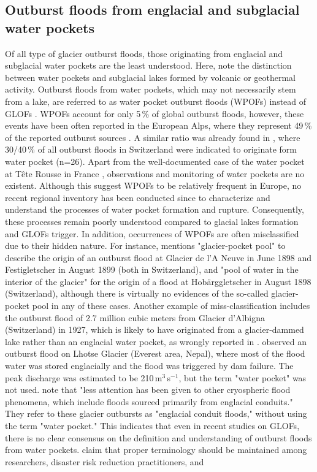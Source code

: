 \subsection{Outburst floods from englacial and subglacial water pockets} %

Of all type of glacier outburst floods, those originating from englacial and subglacial water pockets are the least understood. Here, note the distinction between water pockets and subglacial lakes formed by volcanic or geothermal activity. Outburst floods from water pockets, which may not necessarily stem from a lake, are referred to as water pocket outburst floods (WPOFs) instead of GLOFs \citep[as in][]{Deline&al2004}. WPOFs account for only 5\,\% of global outburst floods, however, these events have been often reported in the European Alps, where they represent 49\,\% of the reported outburst sources \citep{Lutzow&al2023}. A similar ratio was already found in \cite{Haeberli1983}, where 30/40\,\% of all outburst floods in Switzerland were indicated to originate form water pocket (n=26). Apart from the well-documented case of the water pocket at Tête Rousse in France \citep{Vincent&al2010b,Vincent&al2012}, observations and monitoring of water pockets are no existent. Although this suggest WPOFs to be relatively frequent in Europe, no recent regional inventory has been conducted since \cite{Haeberli1983} to characterize and understand the processes of water pocket formation and rupture. Consequently, these processes remain poorly understood compared to glacial lakes formation and GLOFs trigger. In addition, occurrences of WPOFs are often misclassified due to their hidden nature. For instance, \cite{Rabot1905} mentions "glacier-pocket pool" to describe the origin of an outburst flood at Glacier de l'A Neuve in June 1898 and Festigletscher in August 1899 (both in Switzerland), and "pool of water in the interior of the glacier" for the origin of a flood at Hobärggletscher in August 1898 (Switzerland), although there is virtually no evidences of the so-called glacier-pocket pool in any of these cases. Another example of miss-classification includes the outburst flood of 2.7 million cubic meters from Glacier d'Albigna (Switzerland) in 1927, which is likely to have originated from a glacier-dammed lake rather than an englacial water pocket, as wrongly reported in \cite{Lutzow&al2023}. \cite{Rounce&al2017} observed an outburst flood on Lhotse Glacier (Everest area, Nepal), where most of the flood water was stored englacially and the flood was triggered by dam failure. The peak discharge was estimated to be 210\,m$^3$\,s$^{-1}$, but the term "water pocket" was not used. \cite{Byers&al2022} note that "less attention has been given to other cryospheric flood phenomena, which include floods sourced primarily from englacial conduits." They refer to these glacier outbursts as "englacial conduit floods," without using the term "water pocket." This indicates that even in recent studies on GLOFs, there is no clear consensus on the definition and understanding of outburst floods from water pockets. \cite{Emmer&al2022} claim that proper terminology should be maintained among researchers, disaster risk reduction practitioners, and 